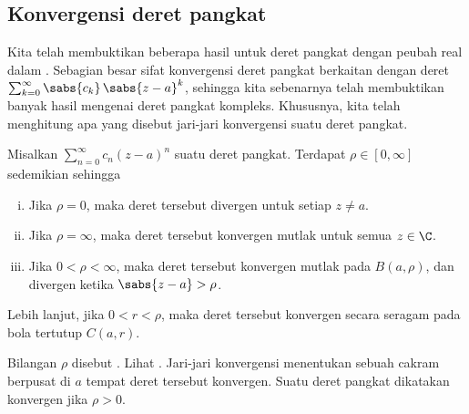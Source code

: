 \subsection{Konvergensi deret pangkat}

Kita telah membuktikan beberapa hasil untuk deret pangkat dengan peubah real dalam
.   Sebagian besar sifat
konvergensi deret pangkat berkaitan dengan deret
$\sum_{k=0}^\infty \sabs{c_k} \, \sabs{z-a}^k$,
sehingga kita sebenarnya telah membuktikan banyak hasil mengenai deret pangkat
kompleks.  Khususnya, kita telah menghitung apa yang disebut
jari-jari konvergensi suatu deret pangkat.

\begin{prop}
\pagebreak[2]
Misalkan $\sum_{n=0}^\infty c_n {(z-a)}^n$ suatu deret pangkat.
Terdapat $\rho \in [0,\infty]$ sedemikian sehingga
\begin{enumerate}[(i)]
\item Jika $\rho = 0$, maka deret tersebut divergen untuk setiap $z \neq a$.
\item Jika $\rho = \infty$, maka deret tersebut konvergen mutlak untuk semua $z \in \C$.
\item Jika $0 < \rho < \infty$, maka deret tersebut
konvergen mutlak pada $B(a,\rho)$,
dan divergen ketika $\sabs{z-a} > \rho$.
\end{enumerate}
Lebih lanjut, jika $0 < r < \rho$, maka
deret tersebut konvergen secara seragam pada bola tertutup $C(a,r)$.
\end{prop}

Bilangan $\rho$ disebut \emph{}.
Lihat .
Jari-jari konvergensi menentukan sebuah cakram berpusat di $a$ tempat deret tersebut konvergen.  Suatu deret pangkat
dikatakan konvergen jika $\rho > 0$.
\begin{myfigureht}
\caption{Jari-jari konvergensi.\label{fig:radiusconvcomplex}}
\end{myfigureht}

